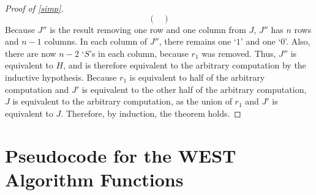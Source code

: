 \documentclass[runningheads]{llncs}
\begin{document}
\begin{proof}[Proof of \ref{simp}]
\[\begin{pmatrix}
  \end{pmatrix}
\]
Because $J''$ is the result removing one row and one column from $J$, $J''$ has $n$ rows and $n-1$ columns. In each column of $J''$, there remains one `$1$' and one `$0$'. Also, there are now $n-2$ `$S$'s in each column, because $r_1$ was removed. Thus, $J''$ is equivalent to $H$, and is therefore equivalent to the arbitrary computation by the inductive hypothesis.
Because $r_1$ is equivalent to half of the arbitrary computation and $J'$ is equivalent to the other half of the arbitrary computation, $J$ is equivalent to the arbitrary computation, as the union of $r_1$ and $J'$ is equivalent to $J$.
Therefore, by induction, the theorem holds.
\end{proof}
\section{Pseudocode for the WEST Algorithm Functions} \label{pseudocode appendix}
 
\end{document}
